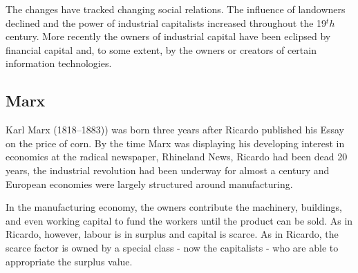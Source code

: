  The changes have tracked changing social relations. The influence of landowners declined and the power of  industrial capitalists increased throughout the 19$^th$ century. More recently the owners of industrial capital have been eclipsed  by financial capital and, to some extent, by the owners or creators of certain information technologies.

\subsection{Marx}
Karl Marx (1818--1883)) was born three years after Ricardo published his Essay on the price of corn. 
By the time Marx was displaying  his developing interest in economics  at the radical newspaper, Rhineland News, Ricardo had been dead 20 years, the industrial revolution had been underway for almost a century and European economies were largely structured around manufacturing. 

 In the manufacturing economy, the owners contribute the machinery, buildings, and even working capital to fund the workers until the product can be sold. %
As in Ricardo, however, labour is in surplus and capital is scarce. As in Ricardo, the scarce factor is owned by a special class - now the capitalists - who are able to appropriate the surplus value. %

